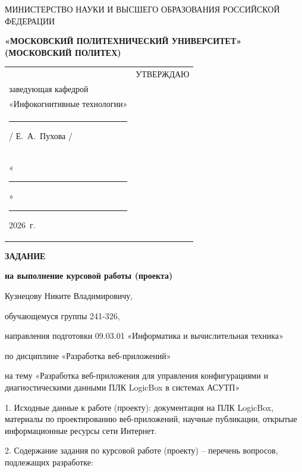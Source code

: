 \documentclass[14pt, a4paper]{extarticle}
\begin{document}
\pagestyle{empty}

\begin{center}
    {\small МИНИСТЕРСТВО НАУКИ И ВЫСШЕГО ОБРАЗОВАНИЯ РОССИЙСКОЙ ФЕДЕРАЦИИ}


    {\small \textbf{«МОСКОВСКИЙ ПОЛИТЕХНИЧЕСКИЙ УНИВЕРСИТЕТ»}} \\
    {\small \textbf{(МОСКОВСКИЙ ПОЛИТЕХ)}}
\end{center}

\begin{tabularx}{\textwidth}{@{} p{} p{} @{}}
     &
    \raggedright
    УТВЕРЖДАЮ                          \\
    заведующая кафедрой                \\
    «Инфокогнитивные технологии»       \\[0.3cm]

    \rule{3cm}{0.4pt} / Е.~А.~Пухова / \\[0.1cm]

    «\rule{0.8cm}{0.4pt}» \rule{3cm}{0.4pt} 2026~г.
\end{tabularx}

\begin{center}

    { \large \textbf{ЗАДАНИЕ}}

    \textbf{на выполнение курсовой работы (проекта)}

    Кузнецову Никите Владимировичу,

\end{center}

обучающемуся группы 241-326,

направления подготовки 09.03.01 «Информатика и вычислительная техника»

по дисциплине «Разработка веб-приложений»

на тему «Разработка веб-приложения для управления конфигурациями и
диагностическими данными ПЛК LogicBox в системах АСУТП»

1. Исходные данные к работе (проекту): документация на ПЛК LogicBox,
материалы по проектированию веб-приложений, научные публикации,
открытые информационные ресурсы сети Интернет.

2. Содержание задания по курсовой работе (проекту) -- перечень вопросов,
подлежащих разработке:
\end{document}
